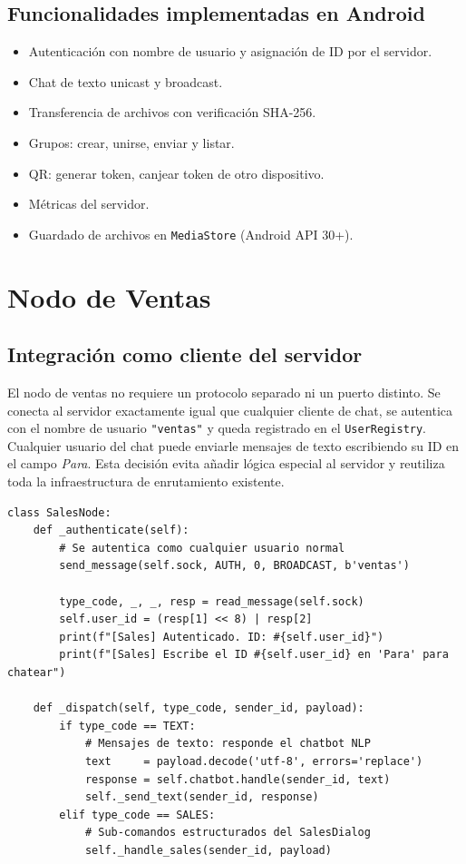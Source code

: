 \documentclass[12pt,a4paper]{article}
\begin{document}
\subsection{Funcionalidades implementadas en Android}

\begin{itemize}
  \item Autenticación con nombre de usuario y asignación de ID por el servidor.
  \item Chat de texto unicast y broadcast.
  \item Transferencia de archivos con verificación SHA-256.
  \item Grupos: crear, unirse, enviar y listar.
  \item QR: generar token, canjear token de otro dispositivo.
  \item Métricas del servidor.
  \item Guardado de archivos en \texttt{MediaStore} (Android API 30+).
\end{itemize}

\section{Nodo de Ventas}

\subsection{Integración como cliente del servidor}

El nodo de ventas no requiere un protocolo separado ni un puerto distinto.
Se conecta al servidor exactamente igual que cualquier cliente de chat,
se autentica con el nombre de usuario \texttt{"ventas"} y queda registrado
en el \texttt{UserRegistry}. Cualquier usuario del chat puede enviarle
mensajes de texto escribiendo su ID en el campo \emph{Para}. Esta decisión
evita añadir lógica especial al servidor y reutiliza toda la infraestructura
de enrutamiento existente.

\begin{lstlisting}[style=python, caption={main.py --- autenticación y dispatch del nodo}]
class SalesNode:
    def _authenticate(self):
        # Se autentica como cualquier usuario normal
        send_message(self.sock, AUTH, 0, BROADCAST, b'ventas')

        type_code, _, _, resp = read_message(self.sock)
        self.user_id = (resp[1] << 8) | resp[2]
        print(f"[Sales] Autenticado. ID: #{self.user_id}")
        print(f"[Sales] Escribe el ID #{self.user_id} en 'Para' para chatear")

    def _dispatch(self, type_code, sender_id, payload):
        if type_code == TEXT:
            # Mensajes de texto: responde el chatbot NLP
            text     = payload.decode('utf-8', errors='replace')
            response = self.chatbot.handle(sender_id, text)
            self._send_text(sender_id, response)
        elif type_code == SALES:
            # Sub-comandos estructurados del SalesDialog
            self._handle_sales(sender_id, payload)
\end{lstlisting}
\end{document}
